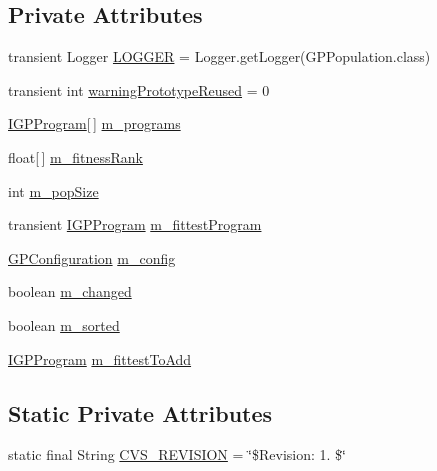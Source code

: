 \subsection*{Private Attributes}
\begin{DoxyCompactItemize}
\item 
transient Logger \hyperlink{classorg_1_1jgap_1_1gp_1_1impl_1_1_g_p_population_a2e511782d083ba5853395ac9cb59b95a}{L\-O\-G\-G\-E\-R} = Logger.\-get\-Logger(G\-P\-Population.\-class)
\item 
transient int \hyperlink{classorg_1_1jgap_1_1gp_1_1impl_1_1_g_p_population_aeb4067371d53afb6f4e0a4939725dd36}{warning\-Prototype\-Reused} = 0
\item 
\hyperlink{interfaceorg_1_1jgap_1_1gp_1_1_i_g_p_program}{I\-G\-P\-Program}\mbox{[}$\,$\mbox{]} \hyperlink{classorg_1_1jgap_1_1gp_1_1impl_1_1_g_p_population_a3bf2729a02a6d7daa8d9badb52cd6c3a}{m\-\_\-programs}
\item 
float\mbox{[}$\,$\mbox{]} \hyperlink{classorg_1_1jgap_1_1gp_1_1impl_1_1_g_p_population_a7f43165486ff8fd8d69f6c9ad7484823}{m\-\_\-fitness\-Rank}
\item 
int \hyperlink{classorg_1_1jgap_1_1gp_1_1impl_1_1_g_p_population_a82de82c54ab2617c745e5493ed025e00}{m\-\_\-pop\-Size}
\item 
transient \hyperlink{interfaceorg_1_1jgap_1_1gp_1_1_i_g_p_program}{I\-G\-P\-Program} \hyperlink{classorg_1_1jgap_1_1gp_1_1impl_1_1_g_p_population_a13678da0768ccaf2dc3b5a892c434cb7}{m\-\_\-fittest\-Program}
\item 
\hyperlink{classorg_1_1jgap_1_1gp_1_1impl_1_1_g_p_configuration}{G\-P\-Configuration} \hyperlink{classorg_1_1jgap_1_1gp_1_1impl_1_1_g_p_population_a54cd610adaf8ce845d6e9ac796f682dc}{m\-\_\-config}
\item 
boolean \hyperlink{classorg_1_1jgap_1_1gp_1_1impl_1_1_g_p_population_a4454c7e30fa80ed50d68c9e06b7f6897}{m\-\_\-changed}
\item 
boolean \hyperlink{classorg_1_1jgap_1_1gp_1_1impl_1_1_g_p_population_a522f220885c90a850191b89116bee75f}{m\-\_\-sorted}
\item 
\hyperlink{interfaceorg_1_1jgap_1_1gp_1_1_i_g_p_program}{I\-G\-P\-Program} \hyperlink{classorg_1_1jgap_1_1gp_1_1impl_1_1_g_p_population_afeeb7ca5a1210d473c18fdfe84844811}{m\-\_\-fittest\-To\-Add}
\end{DoxyCompactItemize}
\subsection*{Static Private Attributes}
\begin{DoxyCompactItemize}
\item 
static final String \hyperlink{classorg_1_1jgap_1_1gp_1_1impl_1_1_g_p_population_ab209b6a7ffefa14c8d2f133e34f4d7e5}{C\-V\-S\-\_\-\-R\-E\-V\-I\-S\-I\-O\-N} = \char`\"{}\$Revision\-: 1. \$\char`\"{}
\end{DoxyCompactItemize}


